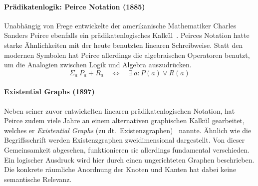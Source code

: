 \paragraph{Prädikatenlogik: Peirce Notation (1885)}
Unabhängig von Frege entwickelte der amerikanische Mathematiker Charles Sanders Peirce ebenfalls ein prädikatenlogisches Kalkül~\cite{Peirce1885}.
Peirces Notation hatte starke Ähnlichkeiten mit der heute benutzten linearen Schreibweise.
Statt den modernen Symbolen hat Peirce allerdings die algebraischen Operatoren benutzt, um die Analogien zwischen Logik und Algebra auszudrücken.
\begin{equation*}
	\Sigma_a\ P_a + R_a
	\quad\Leftrightarrow\quad
	\exists\ a: P(a) \lor R(a)
\end{equation*}

\paragraph{Existential Graphs (1897)}
Neben seiner zuvor entwickelten linearen prädikatenlogischen Notation, hat Peirce zudem viele Jahre an einem alternativen graphischen Kalkül gearbeitet, welches er \textit{Existential Graphs} (zu dt.~Existenzgraphen)~\cite{Sowa2011} nannte.
Ähnlich wie die Begriffsschrift werden Existenzgraphen zweidimensional dargestellt.
Von dieser Gemeinsamkeit abgesehen, funktionieren sie allerdings fundamental verschieden.
Ein logischer Ausdruck wird hier durch einen ungerichteten Graphen beschrieben.
Die konkrete räumliche Anordnung der Knoten und Kanten hat dabei keine semantische Relevanz.

